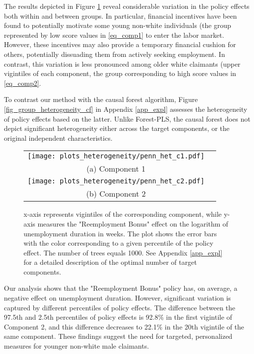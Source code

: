 \documentclass[12pt]{article}
\begin{document}
The results depicted in Figure \ref{fig_het_c2} reveal considerable variation in the policy effects both within and between groups. In particular, financial incentives have been found to potentially motivate some young non-white individuals (the group represented by low score values in \eqref{eq_comp1} to enter the labor market. However, these incentives may also provide a temporary financial cushion for others, potentially dissuading them from actively seeking employment. In contrast, this variation is less pronounced among older white claimants (upper vigintiles of each component, the group corresponding to high score values in \eqref{eq_comp2}. 

To contrast our method with the causal forest algorithm, Figure \ref{fig_group_heterogeneity_cf} in Appendix \ref{app_expl} assesses the heterogeneity of policy effects based on the latter. Unlike Forest-PLS, the causal forest does not depict significant heterogeneity either across the target components, or the original independent characteristics. 




\begin{figure}[H]
\centering
\begin{tabular}{cc}
\texttt{[image: plots\_heterogeneity/penn\_het\_c1.pdf]} \\
(a) Component 1 \\
\texttt{[image: plots\_heterogeneity/penn\_het\_c2.pdf]} \\
(b) Component 2
\end{tabular}
\caption{x-axis represents vigintiles of the corresponding component, while y-axis measures the "Reemployment Bonus" effect on the logarithm of unemployment duration in weeks. The plot shows the error bars with the color corresponding to a given percentile of the policy effect. The number of trees equals 1000. See Appendix \ref{app_expl} for a detailed description of the optimal number of target components. }
\label{fig_het_c2}
\end{figure}



Our analysis shows that the "Reemployment Bonus" policy has, on average, a negative effect on unemployment duration. However, significant variation is captured by different percentiles of policy effects. The difference between the 97.5th and 2.5th percentiles of policy effects is 92.8\% in the first vigintile of Component 2, and this difference decreases to 22.1\% in the 20th vigintile of the same component. These findings suggest the need for targeted, personalized measures for younger non-white male claimants.
\end{document}
